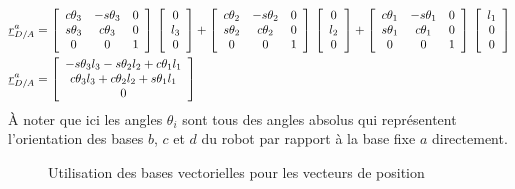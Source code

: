 \begin{align}
\underline{r}_{D/A}^a &= \left[ \begin{array}{c c c}
	c\theta_3 & -s\theta_3 & 0 \\
	s\theta_3 & c\theta_3 & 0 \\
	0 & 0 & 1 
\end{array}  \right] \, \left[ \begin{array}{c} 
0 \\ l_3 \\ 0
\end{array} \right] + \left[ \begin{array}{c c c}
	c\theta_2 & -s\theta_2 & 0 \\
	s\theta_2 & c\theta_2 & 0 \\
	0 & 0 & 1 
\end{array}  \right] \, \left[ \begin{array}{c} 
0 \\ l_2 \\ 0
\end{array} \right]  + \left[ \begin{array}{c c c}
	c\theta_1 & -s\theta_1 & 0 \\
	s\theta_1 & c\theta_1 & 0 \\
	0 & 0 & 1 
\end{array}  \right] \, \left[ \begin{array}{c} 
l_1 \\ 0 \\ 0
\end{array} \right] \\
\underline{r}_{D/A}^a &= \left[ \begin{array}{c}
-s\theta_3 l_3 - s\theta_2 l_2  + c\theta_1 l_1 \\
c\theta_3 l_3 + c\theta_2 l_2  + s\theta_1 l_1  \\
0
\end{array} \right]
\label{eq:robot2dpos}
\end{align} 
À noter que ici les angles $\theta_i$ sont tous des angles absolus qui représentent l'orientation des bases $b$, $c$ et $d$ du robot par rapport à la base fixe $a$ directement.

\begin{figure}[H]
        \centering
				\hspace{10pt}
				\hspace{10pt}
        \caption{Utilisation des bases vectorielles pour les vecteurs de position}
				\label{fig:vecposrot}
\end{figure}

